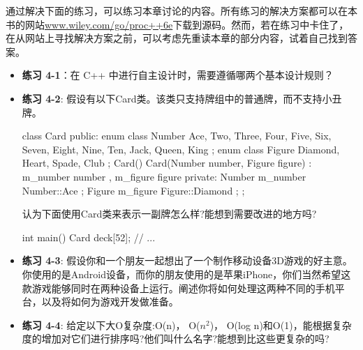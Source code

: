 通过解决下面的练习，可以练习本章讨论的内容。所有练习的解决方案都可以在本书的网站\url{www.wiley.com/go/proc++6e}下载到源码。然而，若在练习中卡住了，在从网站上寻找解决方案之前，可以考虑先重读本章的部分内容，试着自己找到答案。

\begin{itemize}
\item
\textbf{练习 4-1}：在 C++ 中进行自主设计时，需要遵循哪两个基本设计规则？

\item
\textbf{练习 4-2}: 假设有以下Card类。该类只支持牌组中的普通牌，而不支持小丑牌。

\begin{cpp}
class Card
{
    public:
        enum class Number { Ace, Two, Three, Four, Five, Six, Seven, Eight,
            Nine, Ten, Jack, Queen, King };
        enum class Figure { Diamond, Heart, Spade, Club };
        Card() {}
        Card(Number number, Figure figure)
        : m_number { number }, m_figure { figure } {}
    private:
        Number m_number { Number::Ace };
        Figure m_figure { Figure::Diamond };
};
\end{cpp}

认为下面使用Card类来表示一副牌怎么样?能想到需要改进的地方吗?

\begin{cpp}
int main()
{
    Card deck[52];
    // ...
}
\end{cpp}

\item
\textbf{练习 4-3}: 假设你和一个朋友一起想出了一个制作移动设备3D游戏的好主意。你使用的是Android设备，而你的朋友使用的是苹果iPhone，你们当然希望这款游戏能够同时在两种设备上运行。阐述你将如何处理这两种不同的手机平台，以及将如何为游戏开发做准备。

\item
\textbf{练习 4-4}: 给定以下大O复杂度:O(n)， O($n^2$)， O(log n)和O(1)，能根据复杂度的增加对它们进行排序吗?他们叫什么名字?能想到比这些更复杂的吗?
\end{itemize}








